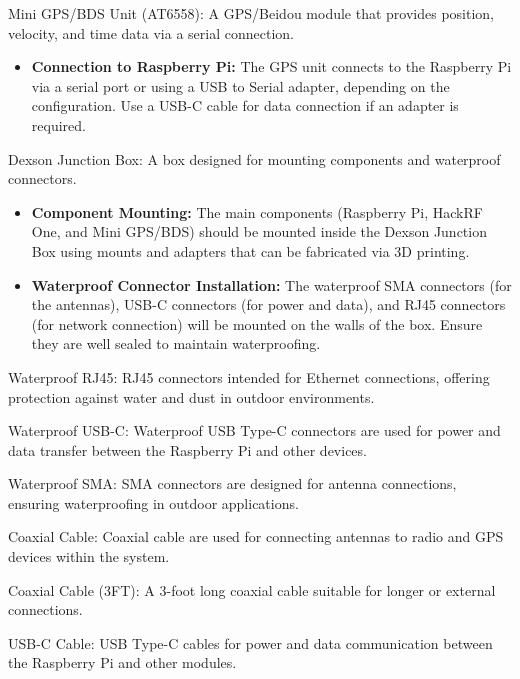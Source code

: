 \begin{list}{*}{}
	\item {Mini GPS/BDS Unit (AT6558):} A GPS/Beidou module that provides position, velocity, and time data via a serial connection.
	\begin{itemize}
		\item \textbf{Connection to Raspberry Pi:} The GPS unit connects to the Raspberry Pi via a serial port or using a USB to Serial adapter, depending on the configuration. Use a USB-C cable for data connection if an adapter is required.
	\end{itemize}
	\item {Dexson Junction Box:} A box designed for mounting components and waterproof connectors.
	\begin{itemize}
		\item \textbf{Component Mounting:} The main components (Raspberry Pi, HackRF One, and Mini GPS/BDS) should be mounted inside the Dexson Junction Box using mounts and adapters that can be fabricated via 3D printing.
		\item \textbf{Waterproof Connector Installation:} The waterproof SMA connectors (for the antennas), USB-C connectors (for power and data), and RJ45 connectors (for network connection) will be mounted on the walls of the box. Ensure they are well sealed to maintain waterproofing.
	\end{itemize}
	
	\item {Waterproof RJ45:} RJ45 connectors intended for Ethernet connections, offering protection against water and dust in outdoor environments.
	
	\item {Waterproof USB-C:} Waterproof USB Type-C connectors are used for power and data transfer between the Raspberry Pi and other devices.
	
	\item {Waterproof SMA:} SMA connectors are designed for antenna connections, ensuring waterproofing in outdoor applications.
	
	\item {Coaxial Cable:} Coaxial cable are used for connecting antennas to radio and GPS devices within the system.
	
	\item {Coaxial Cable (3FT):} A 3-foot long coaxial cable suitable for longer or external connections.
	
	\item {USB-C Cable:} USB Type-C cables for power and data communication between the Raspberry Pi and other modules.
	

\end{list}
